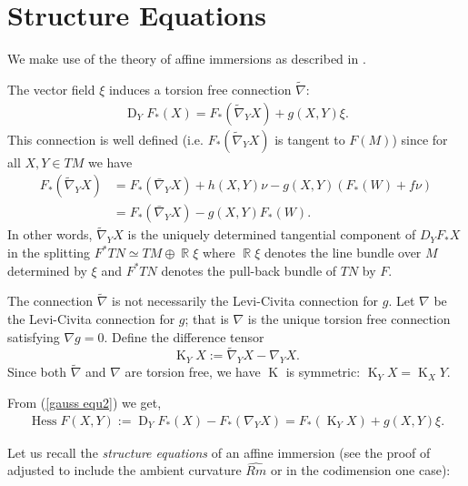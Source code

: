 \documentclass{amsart}
\theoremstyle{definition}
\theoremstyle{remark}
\DeclareMathOperator{\hess}{Hess}
\DeclareMathOperator{\diff}{K}
\DeclareMathOperator{\D}{D}
\DeclareMathOperator{\RR}{\mathbb{R}}
\numberwithin{equation}{section}
\begin{document}



\section{Structure Equations}

We make use of the theory of affine immersions as described in \cite{MR1311248}.

The vector field $\xi$ induces a torsion free connection $\tilde{\nabla}$:
\begin{align}\label{gauss equ2}
\D_YF_{\ast}(X)=F_{\ast}(\tilde{\nabla}_YX)+g(X,Y)\xi.
\end{align}
This connection is well defined (i.e. $F_{\ast}(\tilde{\nabla}_Y X)$ is tangent to $F(M)$) since for all $X,Y\in TM$ we have
\begin{align}
F_{\ast}(\tilde{\nabla}_Y X) &= F_{\ast}(\bar{\nabla}_Y X) + h(X, Y) \nu - g(X, Y) (F_{\ast}(W) + f \nu) \\
&= F_{\ast}(\bar{\nabla}_YX)-g(X,Y)F_{\ast}(W) \nonumber.
\end{align}
In other words, $\tilde{\nabla}_Y X$ is the uniquely determined tangential component of $D_Y F_{\ast} X$ in the splitting $F^{\ast} TN \simeq TM \oplus \RR \xi$ where $\RR\xi$ denotes the line bundle over $M$ determined by $\xi$ and $F^{\ast} TN$ denotes the pull-back bundle of $TN$ by $F$.

The connection $\tilde{\nabla}$ is not necessarily the Levi-Civita connection for $g$. Let $\nabla$ be the Levi-Civita connection for $g$; that is $\nabla$ is the unique torsion free connection satisfying $\nabla g=0.$ Define the difference tensor
\begin{equation}
\label{eq:difftensor}
\diff_YX := \tilde{\nabla}_{Y}X - \nabla_{Y}X.
\end{equation}
Since both $\tilde{\nabla}$ and $\nabla$ are torsion free, we have $\diff$ is symmetric: $\diff_YX = \diff_XY.$

From (\ref{gauss equ2}) we get,
\begin{align}\label{gauss equ3}
\hess F(X,Y):=\D_YF_{\ast}(X)-F_{\ast}(\nabla_YX) = F_{\ast}(\diff_YX) + g(X,Y)\xi.
\end{align}

Let us recall the \emph{structure equations} of an affine immersion (see the proof of \cite[Section II, Theorem 2.1]{MR1311248} adjusted to include the ambient curvature $\widehat{Rm}$ or \cite[p. 197 equations (N1.6)--(N1.9)]{MR1311248} in the codimension one case):
\end{document}
